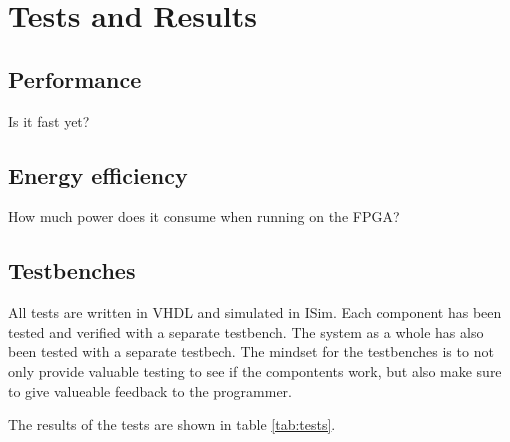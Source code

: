 \section{Tests and Results}


\subsection{Performance}

Is it fast yet?

\subsection{Energy efficiency}

How much power does it consume when running on the FPGA?

\subsection{Testbenches}

All tests are written in VHDL and simulated in ISim.
Each component has been tested and verified with a separate testbench.
The system as a whole has also been tested with a separate testbech.
The mindset for the testbenches is to not only provide valuable testing to see if the compontents work,
but also make sure to give valueable feedback to the programmer.

The results of the tests are shown in table \ref{tab:tests}.

